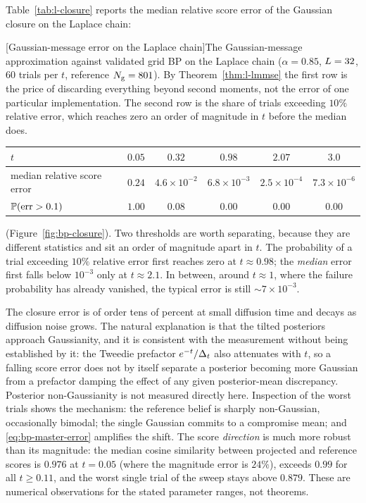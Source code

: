Table~\ref{tab:l-closure} reports the median relative score error of the
Gaussian closure on the Laplace chain:
\begin{center}
\begin{minipage}{\linewidth}\centering
{}[Gaussian-message error on the Laplace chain]{The Gaussian-message approximation against validated grid BP on the Laplace chain ($\alpha = 0.85$, $L = 32$, $60$ trials per $t$, reference $N_{\mathrm{g}} = 801$). By Theorem~\ref{thm:l-lmmse} the first row is the price of discarding everything beyond second moments, not the error of one particular implementation. The second row is the share of trials exceeding $10\%$ relative error, which reaches zero an order of magnitude in $t$ before the median does.}
\label{tab:l-closure}
\begin{tabular}{@{}lccccc@{}}
\toprule
$t$ & $0.05$ & $0.32$ & $0.98$ & $2.07$ & $3.0$ \\
\midrule
median relative score error & $0.24$ & $4.6\times10^{-2}$
& $6.8\times10^{-3}$ & $2.5\times10^{-4}$ & $7.3\times10^{-6}$ \\
$\mathbb{P}(\mathrm{err} > 0.1)$ & $1.00$ & $0.08$ & $0.00$ & $0.00$ & $0.00$ \\
\bottomrule
\end{tabular}
\end{minipage}
\end{center}
\noindent(Figure~\ref{fig:bp-closure}). Two thresholds are worth separating,
because they are different statistics and sit an order of magnitude apart in
$t$. The probability of a trial exceeding $10\%$ relative error first reaches
zero at $t \approx 0.98$; the \emph{median} error first falls below $10^{-3}$
only at $t \approx 2.1$. In between, around $t \approx 1$, where the
failure probability has already vanished, the typical error is still
$\sim\!7\times10^{-3}$.

The closure error is of order tens of percent at small diffusion time and
decays as diffusion noise grows. The natural explanation is that the tilted
posteriors approach Gaussianity, and it is consistent with the measurement
without being established by it: the Tweedie prefactor $e^{-t}/\Delta_t$ also
attenuates with $t$, so a falling score error does not by itself separate a
posterior becoming more Gaussian from a prefactor damping the effect of any
given posterior-mean discrepancy. Posterior non-Gaussianity is not measured
directly here. Inspection of
the worst trials shows the mechanism: the reference belief is sharply
non-Gaussian, occasionally bimodal; the single Gaussian commits to a
compromise mean; and \eqref{eq:bp-master-error} amplifies the shift. The
score \emph{direction} is much more robust than its magnitude: the median
cosine similarity between projected and reference scores is $0.976$ at
$t = 0.05$ (where the magnitude error is $24\%$), exceeds $0.99$ for all
$t \geq 0.11$, and the worst single trial of the sweep stays above $0.879$.
These are numerical observations for the stated parameter ranges, not
theorems.

